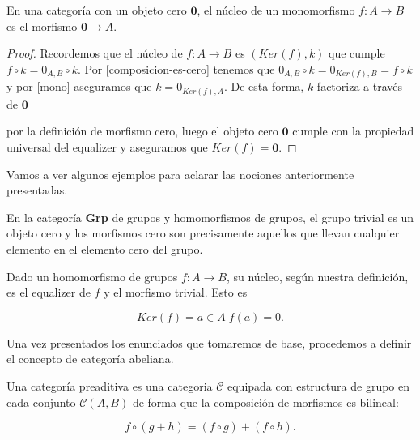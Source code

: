 \begin{proposicion} \label{monomorfismo-tiene-nucleo-0}
    En una categoría con un objeto cero $\boldsymbol{0}$, el núcleo de un monomorfismo $f: A \longrightarrow B$ es el morfismo $\boldsymbol{0} \longrightarrow A$.
\end{proposicion}
\begin{proof}
    Recordemos que el núcleo de $f: A \longrightarrow B$ es $(Ker(f),k)$ que cumple $f \circ k = 0_{A,B} \circ k$. Por \ref{composicion-es-cero} tenemos que $0_{A,B} \circ k = 0_{Ker(f),B} = f \circ k$ y por \ref{mono} aseguramos que $k = 0_{Ker(f),A}$. De esta forma, $k$ factoriza a través de $\boldsymbol{0}$ 
    por la definición de morfismo cero, luego el objeto cero $\boldsymbol{0}$ cumple con la propiedad universal del equalizer y aseguramos que $Ker(f) = \boldsymbol{0}$.
\end{proof}

Vamos a ver algunos ejemplos para aclarar las nociones anteriormente presentadas.

\begin{ejemplo}
    En la categoría \textbf{Grp} de grupos y homomorfismos de grupos, el grupo trivial es un objeto cero y los morfismos cero son precisamente aquellos que llevan cualquier elemento en el elemento cero del grupo.

    Dado un homomorfismo de grupos $f: A \longrightarrow B$, su núcleo, según nuestra definición, es el equalizer de $f$ y el morfismo trivial. Esto es

    \begin{equation}
        Ker(f) = {a \in A | f(a) = 0} \text{.}
    \end{equation}
\end{ejemplo}

Una vez presentados los enunciados que tomaremos de base, procedemos a definir el concepto de categoría abeliana. 

\begin{definicion} 
     Una categoría preaditiva es una categoria $\mathscr{C}$ equipada con estructura de grupo en cada conjunto $\mathscr{C}(A,B)$ de forma que la composición de morfismos es bilineal: 

    \begin{equation}
        f \circ (g + h) = (f \circ g) + (f \circ h) \text{.}
    \end{equation}
\end{definicion}

